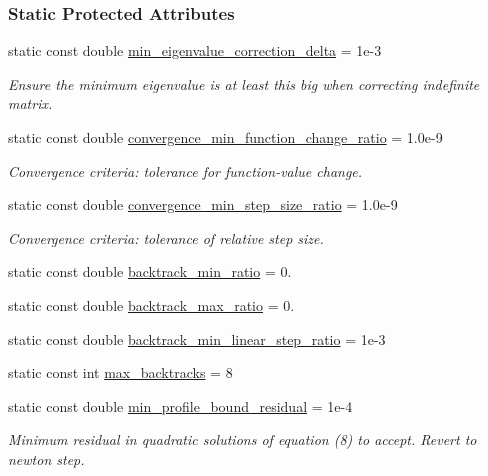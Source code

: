 \subsubsection*{Static Protected Attributes}
\begin{DoxyCompactItemize}
\item 
static const double \hyperlink{classmappel_1_1estimator_1_1IterativeMaximizer_a9c23c94f649688d01e9eb938a692c6f5}{min\+\_\+eigenvalue\+\_\+correction\+\_\+delta} = 1e-\/3
\begin{DoxyCompactList}\small\item\em Ensure the minimum eigenvalue is at least this big when correcting indefinite matrix. \end{DoxyCompactList}\item 
static const double \hyperlink{classmappel_1_1estimator_1_1IterativeMaximizer_a64cc948c3649da324130d6b702310feb}{convergence\+\_\+min\+\_\+function\+\_\+change\+\_\+ratio} = 1.\+0e-\/9
\begin{DoxyCompactList}\small\item\em Convergence criteria\+: tolerance for function-\/value change. \end{DoxyCompactList}\item 
static const double \hyperlink{classmappel_1_1estimator_1_1IterativeMaximizer_a4daa3375ddf2e676980a33630c186f92}{convergence\+\_\+min\+\_\+step\+\_\+size\+\_\+ratio} = 1.\+0e-\/9
\begin{DoxyCompactList}\small\item\em Convergence criteria\+: tolerance of relative step size. \end{DoxyCompactList}\item 
static const double \hyperlink{classmappel_1_1estimator_1_1IterativeMaximizer_aabb0ca8f0a83aa85075bec7c2ed737c3}{backtrack\+\_\+min\+\_\+ratio} = 0.
\item 
static const double \hyperlink{classmappel_1_1estimator_1_1IterativeMaximizer_afa3dd68d0039939f43faf5f9508783b6}{backtrack\+\_\+max\+\_\+ratio} = 0.
\item 
static const double \hyperlink{classmappel_1_1estimator_1_1IterativeMaximizer_ac6f0771c4051b0405156bdc3e199278f}{backtrack\+\_\+min\+\_\+linear\+\_\+step\+\_\+ratio} = 1e-\/3
\item 
static const int \hyperlink{classmappel_1_1estimator_1_1IterativeMaximizer_ac26f7b7965a26fa21f07732c3b1d727e}{max\+\_\+backtracks} = 8
\item 
static const double \hyperlink{classmappel_1_1estimator_1_1IterativeMaximizer_a04b56451448fa004f4ce3da97bfde9ec}{min\+\_\+profile\+\_\+bound\+\_\+residual} = 1e-\/4
\begin{DoxyCompactList}\small\item\em Minimum residual in quadratic solutions of equation (8) to accept. Revert to newton step. \end{DoxyCompactList}\end{DoxyCompactItemize}


